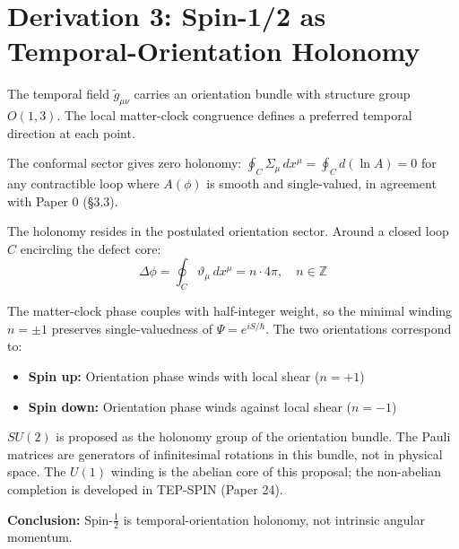 \documentclass{article}
\begin{document}
\section*{Derivation 3: Spin-1/2 as Temporal-Orientation Holonomy}

The temporal field $\tilde{g}_{\mu\nu}$ carries an orientation bundle with structure group $O(1,3)$. The local matter-clock congruence defines a preferred temporal direction at each point.

The conformal sector gives zero holonomy: $\oint_C \Sigma_\mu \, dx^\mu = \oint_C d(\ln A) = 0$ for any contractible loop where $A(\phi)$ is smooth and single-valued, in agreement with Paper 0 (\S3.3).

The holonomy resides in the postulated orientation sector. Around a closed loop $C$ encircling the defect core:
\[
\Delta \phi = \oint_C \vartheta_\mu \, dx^\mu = n \cdot 4\pi, \quad n \in \mathbb{Z}
\]

The matter-clock phase couples with half-integer weight, so the minimal winding $n = \pm 1$ preserves single-valuedness of $\Psi = e^{iS/\hbar}$. The two orientations correspond to:
\begin{itemize}
\item \textbf{Spin up:} Orientation phase winds with local shear ($n = +1$)
\item \textbf{Spin down:} Orientation phase winds against local shear ($n = -1$)
\end{itemize}

$SU(2)$ is proposed as the holonomy group of the orientation bundle. The Pauli matrices are generators of infinitesimal rotations in this bundle, not in physical space. The $U(1)$ winding is the abelian core of this proposal; the non-abelian completion is developed in TEP-SPIN (Paper 24).

\textbf{Conclusion:} Spin-$\tfrac{1}{2}$ is temporal-orientation holonomy, not intrinsic angular momentum.
\end{document}
